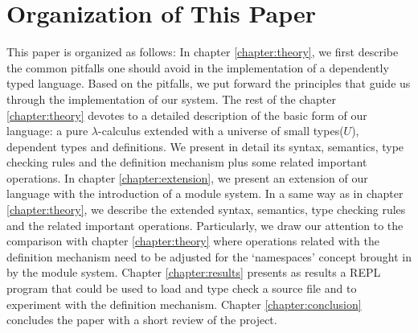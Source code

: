 \section{Organization of This Paper}
This paper is organized as follows: In chapter \ref{chapter:theory}, we first describe the common pitfalls one should avoid in the implementation of a dependently typed language. Based on the pitfalls, we put forward the principles that guide us through the implementation of our system. The rest of the chapter \ref{chapter:theory} devotes to a detailed description of the basic form of our language: a pure $\lambda$-calculus extended with a universe of small types($U$), dependent types and definitions. We present in detail its syntax, semantics, type checking rules and the definition mechanism plus some related important operations. In chapter \ref{chapter:extension}, we present an extension of our language with the introduction of a module system. In a same way as in chapter \ref{chapter:theory}, we describe the extended syntax, semantics, type checking rules and the related important operations. Particularly, we draw our attention to the comparison with chapter \ref{chapter:theory} where operations related with the definition mechanism need to be adjusted for the `namespaces' concept brought in by the module system. Chapter \ref{chapter:results} presents as results a REPL program that could be used to load and type check a source file and to experiment with the definition mechanism. Chapter \ref{chapter:conclusion} concludes the paper with a short review of the project.

